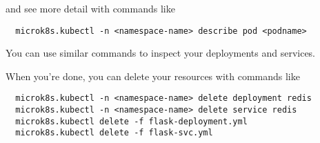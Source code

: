 \documentclass{article}
\begin{document}
and see more detail with commands like 
  
\begin{verbatim}
  microk8s.kubectl -n <namespace-name> describe pod <podname>
\end{verbatim}

You can use similar commands to inspect your deployments and services.

When you're done, you can delete your resources with commands like

\begin{verbatim}
  microk8s.kubectl -n <namespace-name> delete deployment redis
  microk8s.kubectl -n <namespace-name> delete service redis
  microk8s.kubectl delete -f flask-deployment.yml
  microk8s.kubectl delete -f flask-svc.yml

\end{verbatim}
\end{document}
